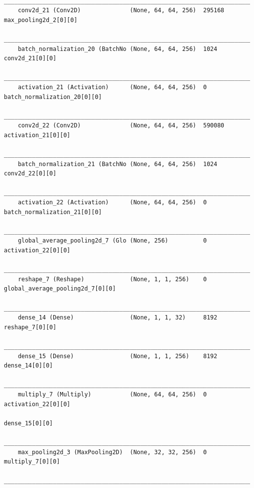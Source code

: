 {\begin{verbatim}
    __________________________________________________________________________________________________
    conv2d_21 (Conv2D)              (None, 64, 64, 256)  295168      max_pooling2d_2[0][0]            
    __________________________________________________________________________________________________
    batch_normalization_20 (BatchNo (None, 64, 64, 256)  1024        conv2d_21[0][0]                  
    __________________________________________________________________________________________________
    activation_21 (Activation)      (None, 64, 64, 256)  0           batch_normalization_20[0][0]     
    __________________________________________________________________________________________________
    conv2d_22 (Conv2D)              (None, 64, 64, 256)  590080      activation_21[0][0]              
    __________________________________________________________________________________________________
    batch_normalization_21 (BatchNo (None, 64, 64, 256)  1024        conv2d_22[0][0]                  
    __________________________________________________________________________________________________
    activation_22 (Activation)      (None, 64, 64, 256)  0           batch_normalization_21[0][0]     
    __________________________________________________________________________________________________
    global_average_pooling2d_7 (Glo (None, 256)          0           activation_22[0][0]              
    __________________________________________________________________________________________________
    reshape_7 (Reshape)             (None, 1, 1, 256)    0           global_average_pooling2d_7[0][0] 
    __________________________________________________________________________________________________
    dense_14 (Dense)                (None, 1, 1, 32)     8192        reshape_7[0][0]                  
    __________________________________________________________________________________________________
    dense_15 (Dense)                (None, 1, 1, 256)    8192        dense_14[0][0]                   
    __________________________________________________________________________________________________
    multiply_7 (Multiply)           (None, 64, 64, 256)  0           activation_22[0][0]              
                                                                        dense_15[0][0]                   
    __________________________________________________________________________________________________
    max_pooling2d_3 (MaxPooling2D)  (None, 32, 32, 256)  0           multiply_7[0][0]                 
    __________________________________________________________________________________________________

\end{verbatim}}

